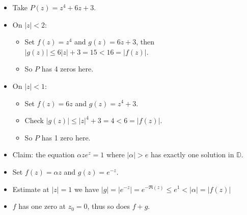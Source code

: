 \begin{example}

\envlist

\begin{itemize}
\tightlist
\item
  Take \(P(z) = z^4 + 6z + 3\).
\item
  On \({\left\lvert {z} \right\rvert} < 2\):

  \begin{itemize}
  \tightlist
  \item
    Set \(f(z) = z^4\) and \(g(z) = 6z + 3\), then
    \({\left\lvert {g(z)} \right\rvert} \leq 6{\left\lvert {z} \right\rvert} + 3 = 15 < 16= {\left\lvert {f(z)} \right\rvert}\).
  \item
    So \(P\) has 4 zeros here.
  \end{itemize}
\item
  On \({\left\lvert {z} \right\rvert} < 1\):

  \begin{itemize}
  \tightlist
  \item
    Set \(f(z) = 6z\) and \(g(z) = z^4 + 3\).
  \item
    Check
    \({\left\lvert {g(z)} \right\rvert} \leq {\left\lvert {z} \right\rvert}^4 + 3 = 4 < 6 = {\left\lvert {f(z)} \right\rvert}\).
  \item
    So \(P\) has 1 zero here.
  \end{itemize}
\end{itemize}

\end{example}

\begin{example}

\envlist

\begin{itemize}
\tightlist
\item
  Claim: the equation \(\alpha z e^z = 1\) where
  \({\left\lvert {\alpha} \right\rvert} > e\) has exactly one solution
  in \({\mathbb{D}}\).
\item
  Set \(f(z) = \alpha z\) and \(g(z) = e^{-z}\).
\item
  Estimate at \({\left\lvert {z} \right\rvert} =1\) we have
  \({\left\lvert {g} \right\rvert} ={\left\lvert {e^{-z}} \right\rvert} = e^{-\Re(z)} \leq e^1 < {\left\lvert {\alpha} \right\rvert} = {\left\lvert {f(z)} \right\rvert}\)
\item
  \(f\) has one zero at \(z_0 = 0\), thus so does \(f+g\).
\end{itemize}

\end{example}


